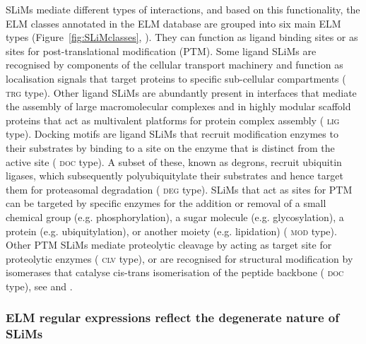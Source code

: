 \documentclass[12pt]{article}
\newcommand\motif[1]{%
    \textsc{\lowercase{#1}}%
}
\begin{document}
SLiMs mediate different types of interactions, and based on this functionality,
the ELM classes annotated in the ELM database are grouped into six main ELM
types (Figure~\ref{fig:SLiMclasses}, \cite{24214962}). They can function as ligand binding sites or
as sites for post-translational modification (PTM). Some ligand SLiMs are
recognised by components of the cellular transport machinery and function as
localisation signals that target proteins to specific sub-cellular compartments
(\motif{TRG} type). Other ligand SLiMs are abundantly present in interfaces that mediate
the assembly of large macromolecular complexes and in highly modular scaffold
proteins that act as multivalent platforms for protein complex assembly
(\motif{LIG} type). Docking motifs are ligand SLiMs that recruit modification enzymes to
their substrates by binding to a site on the enzyme that is distinct from the
active site (\motif{DOC} type). A subset of these, known as degrons, recruit ubiquitin
ligases, which subsequently polyubiquitylate their substrates and hence target
them for proteasomal degradation (\motif{DEG} type). SLiMs that act as sites for PTM can
be targeted by specific enzymes for the addition or removal of a small chemical
group (e.g. phosphorylation), a sugar molecule (e.g. glycosylation), a protein
(e.g. ubiquitylation), or another moiety (e.g. lipidation) (\motif{MOD} type). Other PTM
SLiMs mediate proteolytic cleavage by acting as target site for proteolytic
enzymes (\motif{CLV} type), or are recognised for structural modification by isomerases
that catalyse cis-trans isomerisation of the peptide backbone (\motif{DOC} type), see
\cite{24926813} and \cite{24773235}.

\subsubsection*{ELM regular expressions reflect the degenerate nature of SLiMs}
\end{document}
